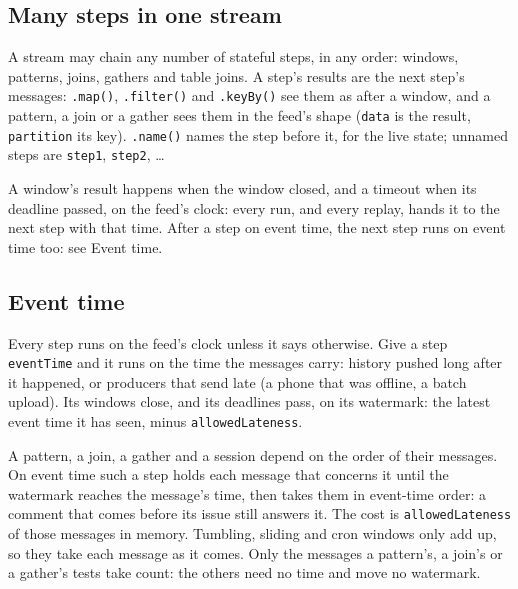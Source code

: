 \subsection{Many steps in one stream}

A stream may chain any number of stateful steps, in any order: windows, patterns, joins, gathers and table joins. A step's results are the next step's messages: \texttt{.map()}, \texttt{.filter()} and \texttt{.keyBy()} see them as after a window, and a pattern, a join or a gather sees them in the feed's shape (\texttt{data} is the result, \texttt{partition} its key). \texttt{.name()} names the step before it, for the live state; unnamed steps are \texttt{step1}, \texttt{step2}, \ldots{}


A window's result happens when the window closed, and a timeout when its deadline passed, on the feed's clock: every run, and every replay, hands it to the next step with that time. After a step on event time, the next step runs on event time too: see Event time.


\subsection{Event time}

Every step runs on the feed's clock unless it says otherwise. Give a step \texttt{eventTime} and it runs on the time the messages carry: history pushed long after it happened, or producers that send late (a phone that was offline, a batch upload). Its windows close, and its deadlines pass, on its watermark: the latest event time it has seen, minus \texttt{allowedLateness}.


A pattern, a join, a gather and a session depend on the order of their messages. On event time such a step holds each message that concerns it until the watermark reaches the message's time, then takes them in event-time order: a comment that comes before its issue still answers it. The cost is \texttt{allowedLateness} of those messages in memory. Tumbling, sliding and cron windows only add up, so they take each message as it comes. Only the messages a pattern's, a join's or a gather's tests take count: the others need no time and move no watermark.

